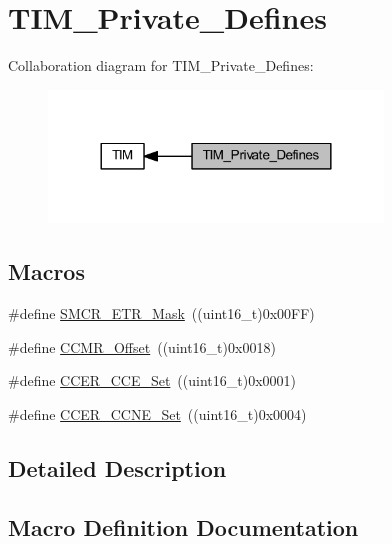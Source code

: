 \hypertarget{group___t_i_m___private___defines}{}\section{T\+I\+M\+\_\+\+Private\+\_\+\+Defines}
\label{group___t_i_m___private___defines}
Collaboration diagram for T\+I\+M\+\_\+\+Private\+\_\+\+Defines\+:
\nopagebreak
\begin{figure}[H]
\begin{center}
\leavevmode
\includegraphics[width=252pt]{group___t_i_m___private___defines}
\end{center}
\end{figure}
\subsection*{Macros}
\begin{DoxyCompactItemize}
\item 
\#define \hyperlink{group___t_i_m___private___defines_ga43819484b70fd8f2f2aa02d4131c9841}{S\+M\+C\+R\+\_\+\+E\+T\+R\+\_\+\+Mask}~((uint16\+\_\+t)0x00\+F\+F)
\item 
\#define \hyperlink{group___t_i_m___private___defines_ga76469c9f56da4e7705336a6ac0248196}{C\+C\+M\+R\+\_\+\+Offset}~((uint16\+\_\+t)0x0018)
\item 
\#define \hyperlink{group___t_i_m___private___defines_ga17c4ed624aa62f19fd496c3f3bd61137}{C\+C\+E\+R\+\_\+\+C\+C\+E\+\_\+\+Set}~((uint16\+\_\+t)0x0001)
\item 
\#define \hyperlink{group___t_i_m___private___defines_ga167dfdf613827d1fdf2e4152497b4bd5}{C\+C\+E\+R\+\_\+\+C\+C\+N\+E\+\_\+\+Set}~((uint16\+\_\+t)0x0004)
\end{DoxyCompactItemize}


\subsection{Detailed Description}


\subsection{Macro Definition Documentation}
\mbox{\label{group___t_i_m___private___defines_ga17c4ed624aa62f19fd496c3f3bd61137}} 
